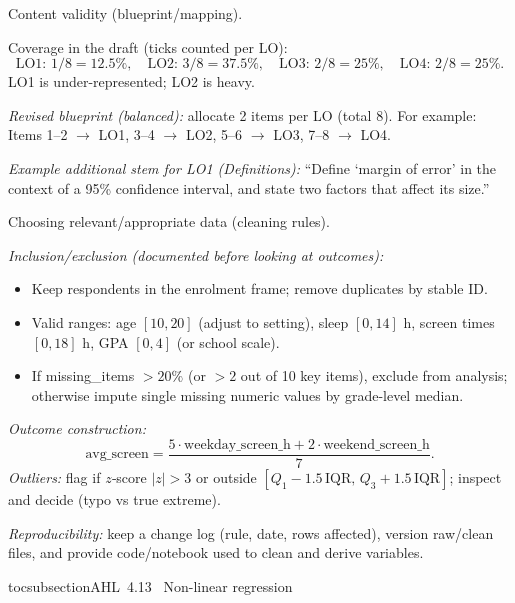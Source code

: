 \documentclass[11pt]{article}
\def\textbf#1{#1}%
\def\texttt#1{#1}%
\begin{document}
\begin{solution}
\textbf{Content validity (blueprint/mapping).}

Coverage in the draft (ticks counted per LO):
\[
\text{LO1: }1/8=12.5\%,\quad
\text{LO2: }3/8=37.5\%,\quad
\text{LO3: }2/8=25\%,\quad
\text{LO4: }2/8=25\%.
\]
LO1 is under-represented; LO2 is heavy.

\emph{Revised blueprint (balanced):} allocate 2 items per LO (total 8). For example:
Items 1–2 $\to$ LO1, 3–4 $\to$ LO2, 5–6 $\to$ LO3, 7–8 $\to$ LO4.

\emph{Example additional stem for LO1 (Definitions):}
“Define ‘margin of error’ in the context of a 95\% confidence interval, and state two factors that affect its size.”
\end{solution}

\begin{solution}
\textbf{Choosing relevant/appropriate data (cleaning rules).}

\emph{Inclusion/exclusion (documented before looking at outcomes):}
\begin{itemize}
  \item Keep respondents in the enrolment frame; remove duplicates by stable ID.
  \item Valid ranges: age $[10,20]$ (adjust to setting), sleep $[0,14]$ h, screen times $[0,18]$ h, GPA $[0,4]$ (or school scale).
  \item If \texttt{missing\_items} $>20\%$ (or $>2$ out of 10 key items), exclude from analysis; otherwise impute single missing numeric values by grade-level median.
\end{itemize}

\emph{Outcome construction:}
\[
\text{avg\_screen}=\frac{5\cdot \text{weekday\_screen\_h}+2\cdot \text{weekend\_screen\_h}}{7}.
\]
\emph{Outliers:} flag if $z$‐score $|z|>3$ or outside $[Q_1-1.5\,\text{IQR},\,Q_3+1.5\,\text{IQR}]$; inspect and decide (typo vs true extreme).

\emph{Reproducibility:} keep a change log (rule, date, rows affected), version raw/clean files, and provide code/notebook used to clean and derive variables.
\end{solution}

tocsubsection{AHL 4.13 \; Non-linear regression}

\end{document}
